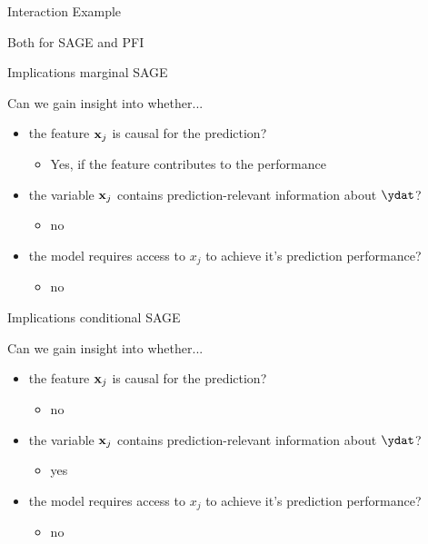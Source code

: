 \documentclass[11pt,compress,t,notes=noshow, xcolor=table]{beamer}
\begin{document}
\begin{vbframe}{Interaction Example}
  
  Both for SAGE and PFI
  
\end{vbframe}


\begin{vbframe}{Implications marginal SAGE}

Can we gain insight into whether...

\begin{itemize}
    \item the feature $\xj$ is causal for the prediction?
    \begin{itemize}
      \item Yes, if the feature contributes to the performance
    \end{itemize}
    \item the variable $\xj$ contains prediction-relevant information about $\ydat$?
    \begin{itemize}
      \item no
    \end{itemize}
    \item the model requires access to $x_j$ to achieve it's prediction performance?  
    \begin{itemize}
        \item no
    \end{itemize}
\end{itemize}

\end{vbframe}

\begin{vbframe}{Implications conditional SAGE}

Can we gain insight into whether...

\begin{itemize}
    \item the feature $\xj$ is causal for the prediction?
    \begin{itemize}
      \item no
    \end{itemize}
    \item the variable $\xj$ contains prediction-relevant information about $\ydat$?
    \begin{itemize}
      \item yes
    \end{itemize}
    \item the model requires access to $x_j$ to achieve it's prediction performance?  
    \begin{itemize}
        \item no
    \end{itemize}
\end{itemize}

\end{vbframe}


\begin{vbframe}
  \printbibliography
\end{vbframe}

\endlecture
\end{document}
